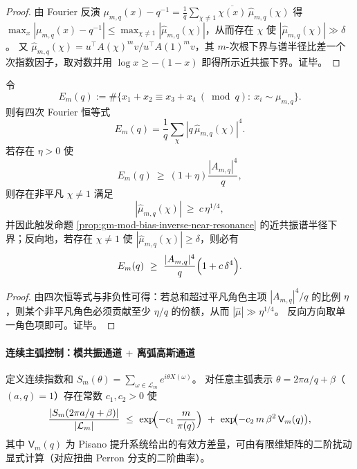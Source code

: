 \begin{proof}
由 Fourier 反演
\(
\mu_{m,q}(x)-q^{-1}=\frac{1}{q}\sum_{\chi\ne 1}\overline{\chi(x)}\,\widehat\mu_{m,q}(\chi)
\)
得 \(\max_x|\mu_{m,q}(x)-q^{-1}|\le \max_{\chi\ne 1}|\widehat\mu_{m,q}(\chi)|\)，从而存在 \(\chi\) 使 \(|\widehat\mu_{m,q}(\chi)|\gg \delta\)。
又 \(\widehat\mu_{m,q}(\chi)=u^\top A(\chi)^m v/u^\top A(1)^m v\)，其 \(m\)-次根下界与谱半径比差一个次指数因子，取对数并用 \(\log x\ge - (1-x)\) 即得所示近共振下界。证毕。
\end{proof}

\begin{proposition}\label{prop:gm-mod-additive-energy-inverse}
令
\[
E_m(q):=\#\{x_1+x_2\equiv x_3+x_4\ (\bmod q):\ x_i\sim\mu_{m,q}\}.
\]
则有四次 Fourier 恒等式
\[
E_m(q)=\frac{1}{q}\sum_{\chi}|q\,\widehat\mu_{m,q}(\chi)|^4.
\]
若存在 \(\eta>0\) 使
\[
E_m(q)\ \ge\ (1+\eta)\frac{|A_{m,q}|^4}{q},
\]
则存在非平凡 \(\chi\neq 1\) 满足
\[
|\widehat\mu_{m,q}(\chi)|\ \ge\ c\,\eta^{1/4},
\]
并因此触发命题 \ref{prop:gm-mod-bias-inverse-near-resonance} 的近共振谱半径下界；反向地，若存在 \(\chi\neq 1\) 使 \(|\widehat\mu_{m,q}(\chi)|\ge \delta\)，则必有
\[
E_m(q)\ \ge\ \frac{|A_{m,q}|^4}{q}\Bigl(1+c\,\delta^4\Bigr).
\]
\end{proposition}

\begin{proof}
由四次恒等式与非负性可得：若总和超过平凡角色主项 \(|A_{m,q}|^4/q\) 的比例 \(\eta\)，则某个非平凡角色必须贡献至少 \(\eta/q\) 的份额，从而 \(|\widehat\mu|\gg \eta^{1/4}\)。
反向方向取单一角色项即可。证毕。
\end{proof}

\paragraph{连续主弧控制：模共振通道 \texorpdfstring{$+$}{+} 离弧高斯通道}
\begin{proposition}\label{prop:gm-continuous-major-arc-control}
定义连续指数和 \(S_m(\theta)=\sum_{\omega\in\mathcal{L}_m}e^{i\theta X(\omega)}\)。
对任意主弧表示 \(\theta=2\pi a/q+\beta\)（\((a,q)=1\)）存在常数 \(c_1,c_2>0\) 使
\[
\frac{|S_m(2\pi a/q+\beta)|}{|\mathcal{L}_m|}
\ \le\
\exp\!\Bigl(-c_1\,\frac{m}{\pi(q)}\Bigr)
\ +\
\exp\!\bigl(-c_2\,m\,\beta^2\,\mathsf{V}_m(q)\bigr),
\]
其中 \(\mathsf{V}_m(q)\) 为 Pisano 提升系统给出的有效方差量，可由有限维矩阵的二阶扰动显式计算（对应扭曲 Perron 分支的二阶曲率）。
\end{proposition}

